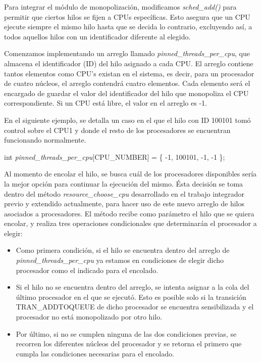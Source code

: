 Para integrar el módulo de monopolización, modificamos \textit{sched\_add()} para permitir que ciertos hilos se fijen a CPUs específicas. Esto asegura que un CPU ejecute siempre el mismo hilo hasta que se decida lo contrario, excluyendo así, a todos aquellos hilos con un identificador diferente al elegido.

Comenzamos implementando un arreglo llamado \textit{pinned\_threads\_per\_cpu}, que almacena el identificador (ID) del hilo asignado a cada CPU. El arreglo contiene tantos elementos como CPU's existan en el sistema, es decir, para un procesador de cuatro núcleos, el arreglo contendrá cuatro elementos. Cada elemento será el encargado de guardar el valor del identificador del hilo que monopoliza el CPU correspondiente.  Si un CPU está libre, el valor en el arreglo es -1.

En el siguiente ejemplo, se detalla un caso en el que el hilo con ID 100101 tomó control sobre el CPU1 y donde el resto de los procesadores se encuentran funcionando normalmente.

int \textit{pinned\_threads\_per\_cpu}[CPU\_NUMBER] = \{ -1, 100101, -1, -1 \};

Al momento de encolar el hilo, se busca cuál de los procesadores disponibles sería la mejor opción para continuar la ejecución del mismo. Ésta decisión se toma dentro del método \textit{resource\_choose\_cpu} desarrollado en el trabajo integrador previo y extendido actualmente, para hacer uso de este nuevo arreglo de hilos asociados a procesadores. El método recibe como parámetro el hilo que se quiera encolar, y realiza tres operaciones condicionales que determinarán el procesador a elegir:

\begin{itemize}
    \item Como primera condición, si el hilo se encuentra dentro del arreglo de \textit{pinned\_threads\_per\_cpu} ya estamos en condiciones de elegir dicho procesador como el indicado para el encolado.
    \item Si el hilo no se encuentra dentro del arreglo, se intenta asignar a la cola del último procesador en el que se ejecutó. Esto es posible solo si la transición TRAN\_ADDTOQUEUE de dicho procesador se encuentra sensibilizada y el procesador no está monopolizado por otro hilo.
    \item Por último, si no se cumplen ninguna de las dos condiciones previas, se recorren los diferentes núcleos del procesador y se retorna el primero que cumpla las condiciones necesarias para el encolado.
\end{itemize}

